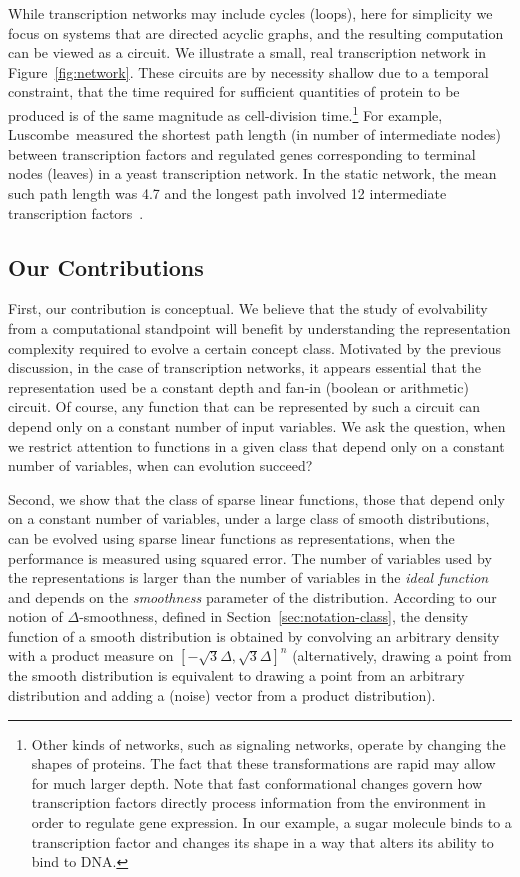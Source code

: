 While transcription networks may include cycles (loops), here for simplicity we
focus on systems that are directed acyclic graphs, and the resulting computation
can be viewed as a circuit. We illustrate a small, real transcription network in
Figure~\ref{fig:network}. These circuits are by necessity shallow due to
a temporal constraint, that the time required for sufficient quantities of
protein to be produced is of the same magnitude as cell-division
time.\footnote{Other kinds of networks, such as signaling networks, operate by
changing the shapes of proteins. The fact that these transformations are rapid
may allow for much larger depth. Note that fast conformational changes govern
how transcription factors directly process information from the environment in
order to regulate gene expression.  In our example, a sugar molecule binds to a
transcription factor and changes its shape in a way that alters its ability to
bind to DNA.} For example, Luscombe~\etal measured the shortest path length (in
number of intermediate nodes) between transcription factors and regulated genes
corresponding to terminal nodes (leaves) in a yeast transcription network. In
the static network, the mean such path length was 4.7 and the longest path
involved 12 intermediate transcription factors~\cite{Luscombe:2004}.

\subsection{Our Contributions}

First, our contribution is conceptual. We believe that the study of evolvability
from a computational standpoint will benefit by understanding the representation
complexity required to evolve a certain concept class. Motivated by the previous
discussion, in the case of transcription networks, it appears essential that the
representation used be a constant depth and fan-in (boolean or arithmetic)
circuit. Of course, any function that can be represented by such a circuit can
depend only on a constant number of input variables. We ask the
question, when we restrict attention to functions in a given class that depend
only on a constant number of variables, when can evolution succeed?

Second, we show that the class of sparse linear functions, those that depend
only on a constant number of variables, under a large class of smooth
distributions, can be evolved using sparse linear functions as representations,
when the performance is measured using squared error. The number of variables
used by the representations is larger than the number of variables in the
\emph{ideal function} and depends on the \emph{smoothness} parameter of the
distribution. According to our notion of $\Delta$-smoothness, defined in
Section~\ref{sec:notation-class}, the density function of a smooth distribution
is obtained by convolving an arbitrary density with a product measure on
$[-\sqrt{3}\Delta, \sqrt{3}\Delta]^n$ (alternatively, drawing
a point from the smooth distribution is equivalent to drawing a point from
an arbitrary distribution and adding a (noise) vector from a product
distribution). 


